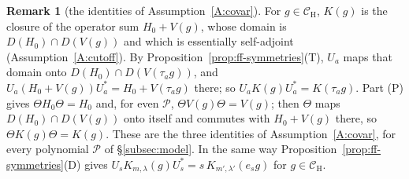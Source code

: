 \documentclass[11pt,a4paper]{article}
\theoremstyle{plain}
\theoremstyle{definition}
\newtheorem{remark}[theorem]{Remark}
\theoremstyle{plain}
\theoremstyle{definition}
\newcommand{\CH}{\mathcal{C}_{\mathrm H}}
\begin{document}
\begin{remark}[the identities of Assumption~\ref{A:covar}]\label{rem:ff-A7}
For $g\in\CH$, $K(g)$ is the closure of the operator sum $H_0+V(g)$, whose domain is
$D(H_0)\cap D(V(g))$ and which is essentially self-adjoint (Assumption~\ref{A:cutoff}).  By Proposition~\ref{prop:ff-symmetries}(T), $U_a$ maps that
domain onto $D(H_0)\cap D(V(\tau_ag))$, and $U_a(H_0+V(g))U_a^*=H_0+V(\tau_ag)$ there; so
$U_aK(g)U_a^*=K(\tau_ag)$.  Part (P) gives $\Theta H_0\Theta=H_0$ and, for even $\mathscr P$,
$\Theta V(g)\Theta=V(g)$; then $\Theta$ maps $D(H_0)\cap D(V(g))$ onto itself and commutes with
$H_0+V(g)$ there, so $\Theta K(g)\Theta=K(g)$.  These are the three identities of Assumption~\ref{A:covar}, for
every polynomial $\mathscr P$ of \S\ref{subsec:model}.  In the same way
Proposition~\ref{prop:ff-symmetries}(D) gives $U_sK_{m,\lambda}(g)U_s^*=
s\,K_{m',\lambda'}(e_sg)$ for $g\in\CH$.
\end{remark}
\end{document}
